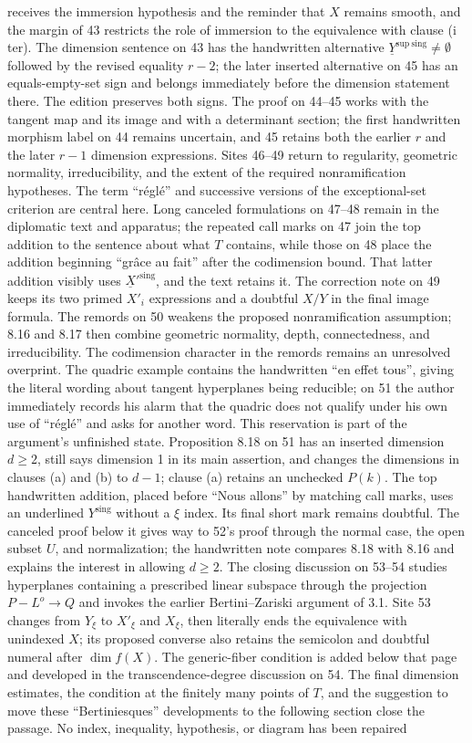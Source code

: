 receives the immersion hypothesis and the reminder that $X$ remains smooth, and the margin of 43 restricts the role of immersion to the equivalence with clause (i ter). The dimension sentence on 43 has the handwritten alternative $\underline{Y}^{\mathrm{sup\ sing}}\neq\emptyset$ followed by the revised equality $r-2$; the later inserted alternative on 45 has an equals-empty-set sign and belongs immediately before the dimension statement there. The edition preserves both signs. The proof on 44--45 works with the tangent map and its image and with a determinant section; the first handwritten morphism label on 44 remains uncertain, and 45 retains both the earlier $r$ and the later $r-1$ dimension expressions. Sites 46--49 return to regularity, geometric normality, irreducibility, and the extent of the required nonramification hypotheses. The term ``réglé'' and successive versions of the exceptional-set criterion are central here. Long canceled formulations on 47--48 remain in the diplomatic text and apparatus; the repeated call marks on 47 join the top addition to the sentence about what $T$ contains, while those on 48 place the addition beginning ``grâce au fait'' after the codimension bound. That latter addition visibly uses $\underline{X}'^{\mathrm{sing}}$, and the text retains it. The correction note on 49 keeps its two primed $X'_i$ expressions and a doubtful $X/Y$ in the final image formula. The remords on 50 weakens the proposed nonramification assumption; 8.16 and 8.17 then combine geometric normality, depth, connectedness, and irreducibility. The codimension character in the remords remains an unresolved overprint. The quadric example contains the handwritten ``en effet tous'', giving the literal wording about tangent hyperplanes being reducible; on 51 the author immediately records his alarm that the quadric does not qualify under his own use of ``réglé'' and asks for another word. This reservation is part of the argument's unfinished state. Proposition 8.18 on 51 has an inserted dimension $d\geq2$, still says dimension 1 in its main assertion, and changes the dimensions in clauses (a) and (b) to $d-1$; clause (a) retains an unchecked $P(k)$. The top handwritten addition, placed before ``Nous allons'' by matching call marks, uses an underlined $Y^{\mathrm{sing}}$ without a $\xi$ index. Its final short mark remains doubtful. The canceled proof below it gives way to 52's proof through the normal case, the open subset $U$, and normalization; the handwritten note compares 8.18 with 8.16 and explains the interest in allowing $d\geq2$. The closing discussion on 53--54 studies hyperplanes containing a prescribed linear subspace through the projection $P-L^o\to Q$ and invokes the earlier Bertini--Zariski argument of 3.1. Site 53 changes from $Y_\xi$ to $X'_\xi$ and $X_\xi$, then literally ends the equivalence with unindexed $X$; its proposed converse also retains the semicolon and doubtful numeral after $\dim f(X)$. The generic-fiber condition is added below that page and developed in the transcendence-degree discussion on 54. The final dimension estimates, the condition at the finitely many points of $T$, and the suggestion to move these ``Bertiniesques'' developments to the following section close the passage. No index, inequality, hypothesis, or diagram has been repaired 